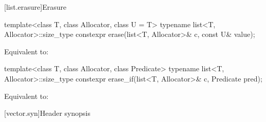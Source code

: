 [list.erasure]{Erasure}

%
\begin{itemdecl}
template<class T, class Allocator, class U = T>
  typename list<T, Allocator>::size_type
    constexpr erase(list<T, Allocator>& c, const U& value);
\end{itemdecl}

\begin{itemdescr}
\pnum
\effects
Equivalent to: 
\end{itemdescr}

%
\begin{itemdecl}
template<class T, class Allocator, class Predicate>
  typename list<T, Allocator>::size_type
    constexpr erase_if(list<T, Allocator>& c, Predicate pred);
\end{itemdecl}

\begin{itemdescr}
\pnum
\effects
Equivalent to: 
\end{itemdescr}

[vector.syn]{Header  synopsis}

